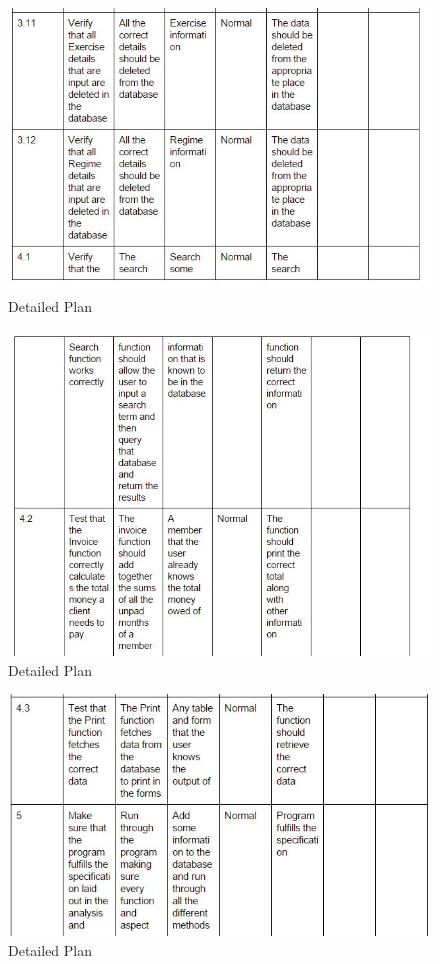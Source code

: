 \begin{itemize}
\begin{figure}[H]
    \includegraphics[width=\textwidth]{DP26.JPG}
    \caption{Detailed Plan} \label{fig:VDetailed Plan}
\end{figure}

\begin{figure}[H]
    \includegraphics[width=\textwidth]{DP27.JPG}
    \caption{Detailed Plan} \label{fig:VDetailed Plan}
\end{figure}

\begin{figure}[H]
    \includegraphics[width=\textwidth]{DP28.JPG}
    \caption{Detailed Plan} \label{fig:VDetailed Plan}
\end{figure}


\end{itemize}
